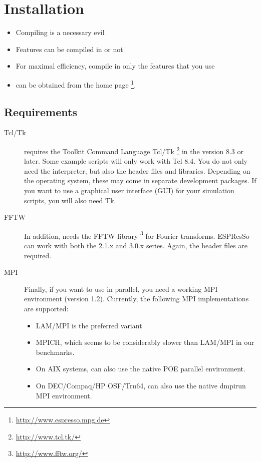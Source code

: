 \chapter{Installation}
\label{chap:install}

\begin{itemize}
\item Compiling \es{} is a necessary evil
\item Features can be compiled in or not
\item For maximal efficiency, compile in only the features that you
  use
\item \es{} can be obtained from the \es{} home page
  \footnote{\url{http://www.espresso.mpg.de}}.
\end{itemize}



\section{Requirements}
\label{sec:requirements}

\begin{description}
\item[Tcl/Tk]  \es{} requires the Toolkit Command
  Language Tcl/Tk \footnote{\url{http://www.tcl.tk/}} in the version
  8.3 or later.  Some example scripts will only work with Tcl 8.4. You
  do not only need the interpreter, but also the header files and
  libraries.  Depending on the operating system, these may come in
  separate development packages. If you want to use a graphical user
  interface (GUI) for your simulation scripts, you will also need Tk.
  
\item[FFTW]  In addition, \es{} needs the FFTW library
  \footnote{\url{http://www.fftw.org/}} for Fourier transforms.
  ESPResSo can work with both the 2.1.x and 3.0.x series. Again, the
  header files are required.
  
\item[MPI]  Finally, if you want to use \es{} in parallel,
  you need a working MPI environment (version 1.2). Currently, the
  following MPI implementations are supported:
  \begin{itemize}
  \item LAM/MPI is the preferred variant
  \item MPICH, which seems to be considerably slower than LAM/MPI in
    our benchmarks.
  \item On AIX systems, \es{} can also use the native POE parallel
    environment.
  \item On DEC/Compaq/HP OSF/Tru64, \es{} can also use the native
    dmpirun MPI environment.
  \end{itemize}
\end{description}

